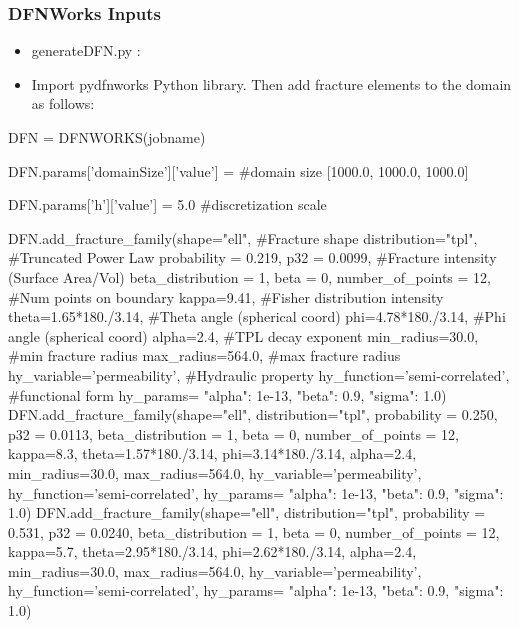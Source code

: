 \documentclass{beamer}
\newcommand\bluecomment[1]{{{\color{blue} #1}}}
\begin{document}
\begin{frame}\frametitle{DFNWorks Inputs}
	
	\begin{itemize}
		\item \begin{semiverbatim}generateDFN.py :\end{semiverbatim}
		\item Import pydfnworks Python library. Then add fracture elements to the domain as follows:
	\end{itemize}
	
	\small
	
	\begin{semiverbatim}
		DFN = DFNWORKS(jobname)
		
		DFN.params['domainSize']['value'] =  \bluecomment{#domain size}
							[1000.0, 1000.0, 1000.0]
		
		DFN.params['h']['value'] = 5.0  \bluecomment{#discretization scale}
		
		
		
		
		
		
		
		
		DFN.add_fracture_family(shape="ell", \bluecomment{#Fracture shape}
		  distribution="tpl", \bluecomment{#Truncated Power Law}
		  probability = 0.219, 
		  p32 = 0.0099, \bluecomment{#Fracture intensity (Surface Area/Vol)}
		  beta_distribution = 1, 
		  beta = 0,
		  number_of_points = 12, \bluecomment{#Num points on boundary}
		  kappa=9.41, \bluecomment{#Fisher distribution intensity}
		  theta=1.65*180./3.14, \bluecomment{#Theta angle (spherical coord)}
		  phi=4.78*180./3.14, \bluecomment{#Phi angle (spherical coord)}
		  alpha=2.4, \bluecomment{#TPL decay exponent}
		  min_radius=30.0, \bluecomment{#min fracture radius}
		  max_radius=564.0, \bluecomment{#max fracture radius}
		  hy_variable='permeability', \bluecomment{#Hydraulic property}
		  hy_function='semi-correlated', \bluecomment{#functional form}
		  hy_params={
			"alpha": 1e-13,
			"beta": 0.9,
			"sigma": 1.0})
		  DFN.add_fracture_family(shape="ell",
		    distribution="tpl",
		    probability = 0.250,
		    p32 = 0.0113,
		    beta_distribution = 1,
		    beta = 0,
		    number_of_points = 12,
		    kappa=8.3,
		    theta=1.57*180./3.14,
		    phi=3.14*180./3.14,
		    alpha=2.4,
		    min_radius=30.0,
		    max_radius=564.0,
		    hy_variable='permeability',
		    hy_function='semi-correlated',
		    hy_params={
		  	  "alpha": 1e-13,
		  	  "beta": 0.9,
		  	  "sigma": 1.0})
		  DFN.add_fracture_family(shape="ell",
		    distribution="tpl",
		    probability = 0.531,
		    p32 = 0.0240,
		    beta_distribution = 1,
		    beta = 0,
		    number_of_points = 12,
		    kappa=5.7,
		    theta=2.95*180./3.14,
		    phi=2.62*180./3.14,
		    alpha=2.4,
		    min_radius=30.0,
		    max_radius=564.0,
		    hy_variable='permeability',
		    hy_function='semi-correlated',
		    hy_params={
		  	  "alpha": 1e-13,
		  	  "beta": 0.9,
		  	  "sigma": 1.0})
		

\end{semiverbatim}
\end{frame}
\end{document}

